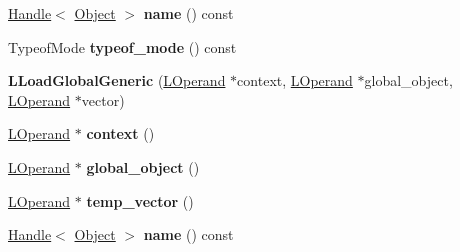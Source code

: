 \begin{DoxyCompactItemize}
\item 
\hyperlink{classv8_1_1internal_1_1_handle}{Handle}$<$ \hyperlink{classv8_1_1internal_1_1_object}{Object} $>$ {\bfseries name} () const \hypertarget{classv8_1_1internal_1_1_l_load_global_generic_a8986cdf04702fb63aee12526199431ab}{}\label{classv8_1_1internal_1_1_l_load_global_generic_a8986cdf04702fb63aee12526199431ab}

\item 
Typeof\+Mode {\bfseries typeof\+\_\+mode} () const \hypertarget{classv8_1_1internal_1_1_l_load_global_generic_a92314902b26af0eba30f17b3c9e9d768}{}\label{classv8_1_1internal_1_1_l_load_global_generic_a92314902b26af0eba30f17b3c9e9d768}

\item 
{\bfseries L\+Load\+Global\+Generic} (\hyperlink{classv8_1_1internal_1_1_l_operand}{L\+Operand} $\ast$context, \hyperlink{classv8_1_1internal_1_1_l_operand}{L\+Operand} $\ast$global\+\_\+object, \hyperlink{classv8_1_1internal_1_1_l_operand}{L\+Operand} $\ast$vector)\hypertarget{classv8_1_1internal_1_1_l_load_global_generic_a5992cad6cdc59da767d3d35fdbf4c4f7}{}\label{classv8_1_1internal_1_1_l_load_global_generic_a5992cad6cdc59da767d3d35fdbf4c4f7}

\item 
\hyperlink{classv8_1_1internal_1_1_l_operand}{L\+Operand} $\ast$ {\bfseries context} ()\hypertarget{classv8_1_1internal_1_1_l_load_global_generic_acb9446dcc83f4319988b01ff0d957bf6}{}\label{classv8_1_1internal_1_1_l_load_global_generic_acb9446dcc83f4319988b01ff0d957bf6}

\item 
\hyperlink{classv8_1_1internal_1_1_l_operand}{L\+Operand} $\ast$ {\bfseries global\+\_\+object} ()\hypertarget{classv8_1_1internal_1_1_l_load_global_generic_a43bc76ffc93765b0231ba74a702acb19}{}\label{classv8_1_1internal_1_1_l_load_global_generic_a43bc76ffc93765b0231ba74a702acb19}

\item 
\hyperlink{classv8_1_1internal_1_1_l_operand}{L\+Operand} $\ast$ {\bfseries temp\+\_\+vector} ()\hypertarget{classv8_1_1internal_1_1_l_load_global_generic_a6e6428d159408fa7d9a31d38cc08919c}{}\label{classv8_1_1internal_1_1_l_load_global_generic_a6e6428d159408fa7d9a31d38cc08919c}

\item 
\hyperlink{classv8_1_1internal_1_1_handle}{Handle}$<$ \hyperlink{classv8_1_1internal_1_1_object}{Object} $>$ {\bfseries name} () const \hypertarget{classv8_1_1internal_1_1_l_load_global_generic_a8986cdf04702fb63aee12526199431ab}{}\label{classv8_1_1internal_1_1_l_load_global_generic_a8986cdf04702fb63aee12526199431ab}


\end{DoxyCompactItemize}
